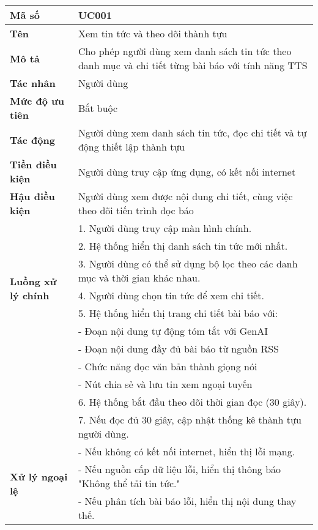 \begingroup
\renewcommand{\arraystretch}{1.1}
\small
\centering
\noindent
\begin{minipage}{\textwidth}
    \centering
    \begin{tabular}{|m{3cm}|m{9cm}|}
        \hline
        \textbf{Mã số}  & UC001 \\
        \hline
        \textbf{Tên}  & Xem tin tức và theo dõi thành tựu \\
        \hline
        \textbf{Mô tả}  & Cho phép người dùng xem danh sách tin tức theo danh mục và chi tiết từng bài báo với tính năng TTS \\
        \hline
        \textbf{Tác nhân}  & Người dùng \\
        \hline
        \textbf{Mức độ ưu tiên}  & Bắt buộc \\
        \hline
        \textbf{Tác động}  & Người dùng xem danh sách tin tức, đọc chi tiết và tự động thiết lập thành tựu \\
        \hline
        \textbf{Tiền điều kiện}  & Người dùng truy cập ứng dụng, có kết nối internet \\
        \hline
        \textbf{Hậu điều kiện}  & Người dùng xem được nội dung chi tiết, cùng việc theo dõi tiến trình đọc báo \\
        \hline
        \multirow{7}{*}{\textbf{Luồng xử lý chính}}
            & 1. Người dùng truy cập màn hình chính. \\
            & 2. Hệ thống hiển thị danh sách tin tức mới nhất. \\
            & 3. Người dùng có thể sử dụng bộ lọc theo các danh mục và thời gian khác nhau. \\
            & 4. Người dùng chọn tin tức để xem chi tiết. \\
            & 5. Hệ thống hiển thị trang chi tiết bài báo với: \\
            & - Đoạn nội dung tự động tóm tắt với GenAI \\
            & - Đoạn nội dung đầy đủ bài báo từ nguồn RSS \\
            & - Chức năng đọc văn bản thành giọng nói \\
            & - Nút chia sẻ và lưu tin xem ngoại tuyến \\
            & 6. Hệ thống bắt đầu theo dõi thời gian đọc (30 giây). \\
            & 7. Nếu đọc đủ 30 giây, cập nhật thống kê thành tựu người dùng. \\
        \hline
        \multirow{3}{*}{\textbf{Xử lý ngoại lệ}}
            & - Nếu không có kết nối internet, hiển thị lỗi mạng. \\
            & - Nếu nguồn cấp dữ liệu lỗi, hiển thị thông báo "Không thể tải tin tức." \\
            & - Nếu phân tích bài báo lỗi, hiển thị nội dung thay thế. \\
        \hline
    \end{tabular}
\end{minipage}
\endgroup

